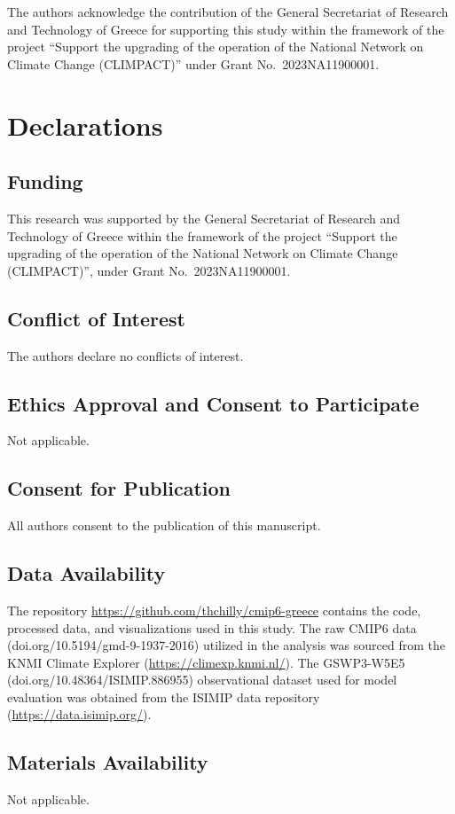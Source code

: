 \documentclass[pdflatex,sn-chicago]{sn-jnl}%
\theoremstyle{thmstyleone}%
\theoremstyle{thmstyletwo}%
\theoremstyle{thmstylethree}%
\begin{document}
The authors acknowledge the contribution of the General Secretariat of Research and Technology of Greece for supporting this study within the framework of the project ``Support the upgrading of the operation of the National Network on Climate Change (CLIMPACT)'' under Grant No.~2023NA11900001.

\section*{Declarations}
\subsection*{Funding}
This research was supported by the General Secretariat of Research and Technology of Greece 
within the framework of the project ``Support the upgrading of the operation of the National Network on Climate Change (CLIMPACT)'', 
under Grant No.~2023NA11900001.

\subsection*{Conflict of Interest}
The authors declare no conflicts of interest.

\subsection*{Ethics Approval and Consent to Participate}
Not applicable.

\subsection*{Consent for Publication}
All authors consent to the publication of this manuscript.

\subsection*{Data Availability}
The repository \url{https://github.com/thchilly/cmip6-greece} contains the code, processed data, and visualizations used in this study. The raw CMIP6 data (doi.org/10.5194/gmd-9-1937-2016) utilized in the analysis was sourced from the KNMI Climate Explorer (\url{https://climexp.knmi.nl/}). The GSWP3-W5E5 (doi.org/10.48364/ISIMIP.886955) observational dataset used for model evaluation was obtained from the ISIMIP data repository (\url{https://data.isimip.org/}).

\subsection*{Materials Availability}
Not applicable.
\end{document}
